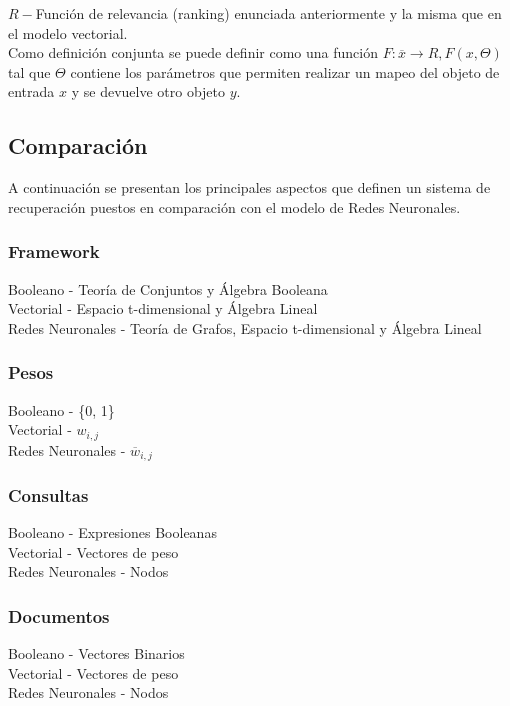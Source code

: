 \documentclass{llncs}
\begin{document}
$R -$Funci\'on de relevancia (ranking) enuncia\-da anteriormente y la misma que en el modelo vectorial.\\

Como definici\'on conjunta se puede definir como una funci\'on $F:\overline{x} \rightarrow R, F(x, \Theta)$ tal que $\Theta$ contiene los par\'ametros
que permiten realizar un mapeo del objeto de entrada $x$ y se devuelve otro objeto $y$.\\

\subsection{Comparaci\'on}

A continuaci\'on se presentan los principales aspectos que definen un sistema de recuperaci\'on puestos en comparaci\'on con el modelo de Redes Neuronales.\\

\subsubsection{Framework}
Booleano - Teor\'ia de Conjuntos y \'Algebra Booleana \\
Vectorial - Espacio t-dimensional y \'Algebra Lineal \\
Redes Neuronales - Teor\'ia de Grafos, Espacio t-dimensional y \'Algebra Lineal

\subsubsection{Pesos}
Booleano - \{0, 1\} \\
Vectorial - $w_{i,j}$ \\
Redes Neuronales - $\overline{w}_{i, j}$

\subsubsection{Consultas}
Booleano -  Expresiones Booleanas \\
Vectorial - Vectores de peso \\
Redes Neuronales - Nodos

\subsubsection{Documentos}
Booleano -  Vectores Binarios \\
Vectorial - Vectores de peso \\
Redes Neuronales - Nodos
\end{document}
